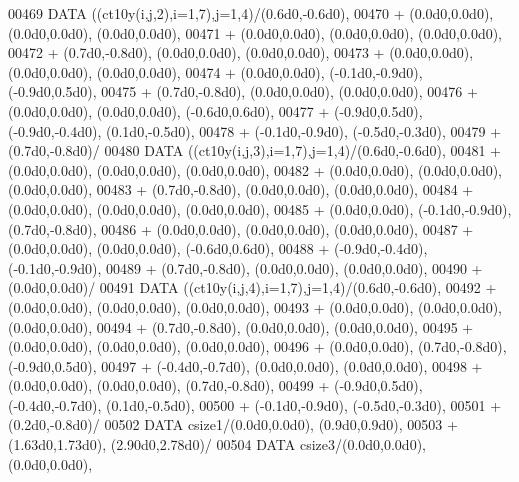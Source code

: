 \begin{DoxyCode}
00469       \textcolor{keyword}{DATA}              ((ct10y(i,j,2),i=1,7),j=1,4)/(0.6d0,-0.6d0),
00470      +                  (0.0d0,0.0d0), (0.0d0,0.0d0), (0.0d0,0.0d0),
00471      +                  (0.0d0,0.0d0), (0.0d0,0.0d0), (0.0d0,0.0d0),
00472      +                  (0.7d0,-0.8d0), (0.0d0,0.0d0), (0.0d0,0.0d0),
00473      +                  (0.0d0,0.0d0), (0.0d0,0.0d0), (0.0d0,0.0d0),
00474      +                  (0.0d0,0.0d0), (-0.1d0,-0.9d0), (-0.9d0,0.5d0),
00475      +                  (0.7d0,-0.8d0), (0.0d0,0.0d0), (0.0d0,0.0d0),
00476      +                  (0.0d0,0.0d0), (0.0d0,0.0d0), (-0.6d0,0.6d0),
00477      +                  (-0.9d0,0.5d0), (-0.9d0,-0.4d0), (0.1d0,-0.5d0),
00478      +                  (-0.1d0,-0.9d0), (-0.5d0,-0.3d0),
00479      +                  (0.7d0,-0.8d0)/
00480       \textcolor{keyword}{DATA}              ((ct10y(i,j,3),i=1,7),j=1,4)/(0.6d0,-0.6d0),
00481      +                  (0.0d0,0.0d0), (0.0d0,0.0d0), (0.0d0,0.0d0),
00482      +                  (0.0d0,0.0d0), (0.0d0,0.0d0), (0.0d0,0.0d0),
00483      +                  (0.7d0,-0.8d0), (0.0d0,0.0d0), (0.0d0,0.0d0),
00484      +                  (0.0d0,0.0d0), (0.0d0,0.0d0), (0.0d0,0.0d0),
00485      +                  (0.0d0,0.0d0), (-0.1d0,-0.9d0), (0.7d0,-0.8d0),
00486      +                  (0.0d0,0.0d0), (0.0d0,0.0d0), (0.0d0,0.0d0),
00487      +                  (0.0d0,0.0d0), (0.0d0,0.0d0), (-0.6d0,0.6d0),
00488      +                  (-0.9d0,-0.4d0), (-0.1d0,-0.9d0),
00489      +                  (0.7d0,-0.8d0), (0.0d0,0.0d0), (0.0d0,0.0d0),
00490      +                  (0.0d0,0.0d0)/
00491       \textcolor{keyword}{DATA}              ((ct10y(i,j,4),i=1,7),j=1,4)/(0.6d0,-0.6d0),
00492      +                  (0.0d0,0.0d0), (0.0d0,0.0d0), (0.0d0,0.0d0),
00493      +                  (0.0d0,0.0d0), (0.0d0,0.0d0), (0.0d0,0.0d0),
00494      +                  (0.7d0,-0.8d0), (0.0d0,0.0d0), (0.0d0,0.0d0),
00495      +                  (0.0d0,0.0d0), (0.0d0,0.0d0), (0.0d0,0.0d0),
00496      +                  (0.0d0,0.0d0), (0.7d0,-0.8d0), (-0.9d0,0.5d0),
00497      +                  (-0.4d0,-0.7d0), (0.0d0,0.0d0), (0.0d0,0.0d0),
00498      +                  (0.0d0,0.0d0), (0.0d0,0.0d0), (0.7d0,-0.8d0),
00499      +                  (-0.9d0,0.5d0), (-0.4d0,-0.7d0), (0.1d0,-0.5d0),
00500      +                  (-0.1d0,-0.9d0), (-0.5d0,-0.3d0),
00501      +                  (0.2d0,-0.8d0)/
00502       \textcolor{keyword}{DATA}              csize1/(0.0d0,0.0d0), (0.9d0,0.9d0),
00503      +                  (1.63d0,1.73d0), (2.90d0,2.78d0)/
00504       \textcolor{keyword}{DATA}              csize3/(0.0d0,0.0d0), (0.0d0,0.0d0),

\end{DoxyCode}
